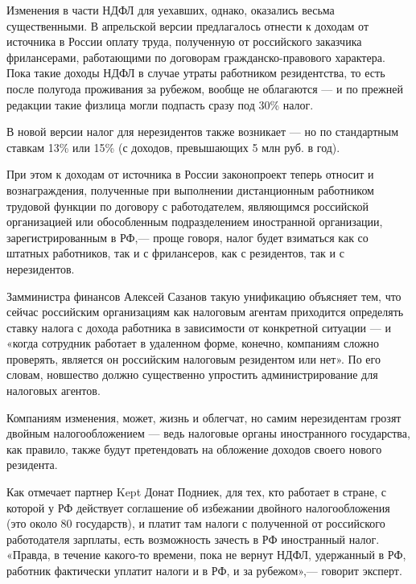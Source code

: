 Изменения в части НДФЛ для уехавших, однако, оказались весьма существенными. В апрельской версии предлагалось отнести к доходам от источника в России оплату труда, полученную от российского заказчика фрилансерами, работающими по договорам гражданско-правового характера. Пока такие доходы НДФЛ в случае утраты работником резидентства, то есть после полугода проживания за рубежом, вообще не облагаются — и по прежней редакции такие физлица могли подпасть сразу под 30\% налог.

\begin{fancyquotes}
    В новой версии налог для нерезидентов также возникает — но по стандартным ставкам 13\% или 15\% (с доходов, превышающих 5 млн руб. в год).
\end{fancyquotes}

При этом к доходам от источника в России законопроект теперь относит и вознаграждения, полученные при выполнении дистанционным работником трудовой функции по договору с работодателем, являющимся российской организацией или обособленным подразделением иностранной организации, зарегистрированным в РФ,— проще говоря, налог будет взиматься как со штатных работников, так и с фрилансеров, как с резидентов, так и с нерезидентов.

Замминистра финансов Алексей Сазанов такую унификацию объясняет тем, что сейчас российским организациям как налоговым агентам приходится определять ставку налога с дохода работника в зависимости от конкретной ситуации — и «когда сотрудник работает в удаленном форме, конечно, компаниям сложно проверять, является он российским налоговым резидентом или нет». По его словам, новшество должно существенно упростить администрирование для налоговых агентов.

\begin{fancyquotes}
    Компаниям изменения, может, жизнь и облегчат, но самим нерезидентам грозят двойным налогообложением — ведь налоговые органы иностранного государства, как правило, также будут претендовать на обложение доходов своего нового резидента.
\end{fancyquotes}

Как отмечает партнер Kept Донат Подниек, для тех, кто работает в стране, с которой у РФ действует соглашение об избежании двойного налогообложения (это около 80 государств), и платит там налоги с полученной от российского работодателя зарплаты, есть возможность зачесть в РФ иностранный налог. «Правда, в течение какого-то времени, пока не вернут НДФЛ, удержанный в РФ, работник фактически уплатит налоги и в РФ, и за рубежом»,— говорит эксперт.

